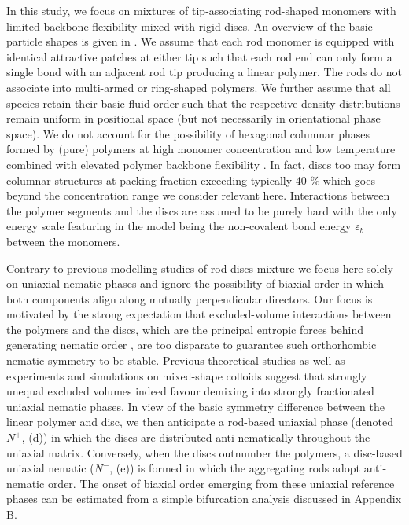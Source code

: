 In this study, we focus on mixtures of tip-associating rod-shaped monomers with limited backbone flexibility  mixed with rigid discs. An overview of the basic particle shapes is given in . We assume that each rod monomer is equipped with identical attractive patches at either tip such that each rod end can only form a single bond  with an adjacent rod tip producing a linear polymer. The rods do not associate into multi-armed or ring-shaped polymers. We further assume that all species retain their basic fluid order such that the respective density distributions remain uniform in positional space (but not necessarily in orientational phase space). We do not account for the possibility of hexagonal columnar phases formed by (pure) polymers at high monomer concentration and low temperature combined with elevated polymer backbone flexibility  \cite{taylorherzfeld1991,schoot1996}. In fact, discs too may form columnar structures at packing fraction exceeding typically 40 \% \cite{frenkelcol1989,veerman1992,kooij_nature2000} which goes beyond the concentration range we consider relevant here.  Interactions between the polymer segments and the discs are assumed to be purely hard with the only energy scale featuring in the model being the non-covalent bond energy $\varepsilon_{b}$ between the monomers.

 Contrary to previous modelling studies of rod-discs mixture we focus here solely on uniaxial nematic phases and ignore the possibility of biaxial order in which both components align along mutually perpendicular directors. Our focus is motivated by the strong expectation that excluded-volume interactions between the polymers and the discs, which are the principal entropic forces behind generating nematic order \cite{Onsager}, are too disparate to guarantee such orthorhombic nematic symmetry to be stable. Previous theoretical studies \cite{jacksonbiaxrev,varga2002,jacksonbiax,wensinkrodplate,wensinkbiaxial} as well as experiments \cite{kooijlangmuir2000,kooijprl2000,woolston2015} and simulations \cite{campallenbolhuisfrenkel,galindo1,galindo2} on mixed-shape colloids  suggest that strongly unequal excluded volumes indeed favour demixing into strongly fractionated uniaxial nematic phases.  In view of the basic symmetry difference  between the linear polymer and disc, we  then anticipate a rod-based uniaxial phase (denoted $N^{+}$,  (d)) in which the discs are distributed  anti-nematically throughout the uniaxial matrix. Conversely, when the discs outnumber the polymers,  a disc-based uniaxial nematic ($N^{-}$,   (e)) is formed in which the aggregating rods adopt anti-nematic order. The onset of biaxial order emerging from these uniaxial reference phases can be estimated from a simple bifurcation analysis discussed in Appendix B. 
 
